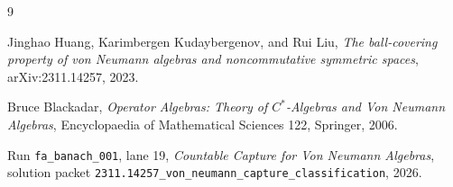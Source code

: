 \documentclass[11pt]{article}
\begin{document}
\begin{thebibliography}{9}

Jinghao Huang, Karimbergen Kudaybergenov, and Rui Liu,
\emph{The ball-covering property of von Neumann algebras and noncommutative
symmetric spaces},
arXiv:2311.14257, 2023.

Bruce Blackadar,
\emph{Operator Algebras: Theory of \(C^*\)-Algebras and Von Neumann
Algebras},
Encyclopaedia of Mathematical Sciences 122, Springer, 2006.

Run \texttt{fa\_banach\_001}, lane 19,
\emph{Countable Capture for Von Neumann Algebras},
solution packet
\texttt{2311.14257\_von\_neumann\_capture\_classification}, 2026.

\end{thebibliography}
\end{document}
